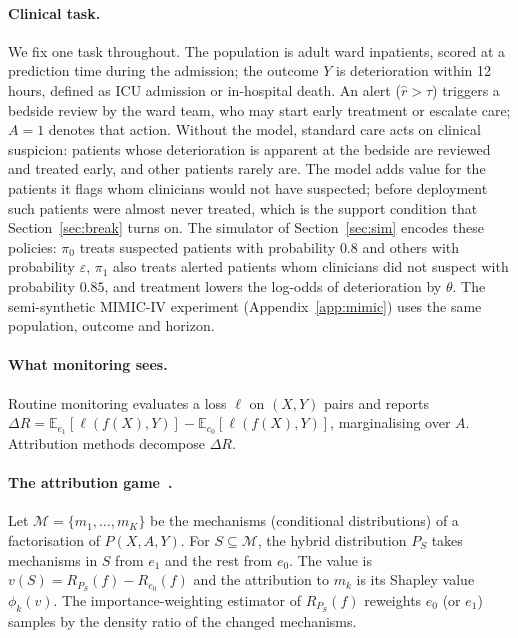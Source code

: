 \documentclass[letterpaper]{article} %
\newcommand{\E}{\mathbb{E}}
\newcommand{\rhat}{\hat r}
\begin{document}
\paragraph{Clinical task.} We fix one task throughout. The population is adult
ward inpatients, scored at a prediction time during the admission; the outcome
$Y$ is deterioration within 12 hours, defined as ICU admission or in-hospital
death. An alert ($\rhat > \tau$) triggers a bedside review by the ward team, who
may start early treatment or escalate care; $A = 1$ denotes that action.
Without the model, standard care acts on clinical suspicion: patients whose
deterioration is apparent at the bedside are reviewed and treated early, and
other patients rarely are. The model adds value for the patients it flags whom
clinicians would not have suspected; before deployment such patients were
almost never treated, which is the support condition that
Section~\ref{sec:break} turns on. The simulator of Section~\ref{sec:sim} encodes
these policies: $\pi_0$ treats suspected patients with probability $0.8$ and
others with probability $\varepsilon$, $\pi_1$ also treats alerted patients whom
clinicians did not suspect with probability $0.85$, and treatment lowers the
log-odds of deterioration by $\theta$. The semi-synthetic MIMIC-IV experiment
(Appendix~\ref{app:mimic}) uses the same population, outcome and horizon.

\paragraph{What monitoring sees.} Routine monitoring evaluates a loss $\ell$ on
$(X, Y)$ pairs and reports
$\Delta R = \E_{e_1}[\ell(f(X), Y)] - \E_{e_0}[\ell(f(X), Y)]$,
marginalising over $A$. Attribution methods decompose $\Delta R$.

\paragraph{The attribution game~\citep{zhang2023attributing}.} Let
$\mathcal{M} = \{m_1, \ldots, m_K\}$ be the mechanisms (conditional
distributions) of a factorisation of $P(X, A, Y)$. For $S \subseteq
\mathcal{M}$, the hybrid distribution $P_S$ takes mechanisms in $S$ from $e_1$
and the rest from $e_0$. The value is $v(S) = R_{P_S}(f) - R_{e_0}(f)$ and the
attribution to $m_k$ is its Shapley value $\phi_k(v)$. The importance-weighting
estimator of $R_{P_S}(f)$ reweights $e_0$ (or $e_1$) samples by the density
ratio of the changed mechanisms.
\end{document}
